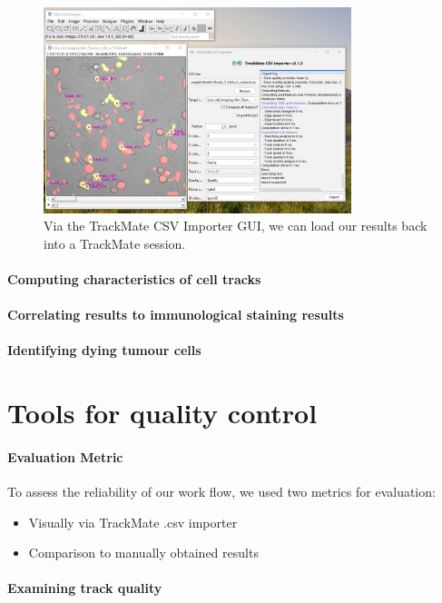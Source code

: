 \documentclass{report}
\begin{document}
\begin{figure}[h!]
\centering
\includegraphics[width=0.8\textwidth]{Screenshot_TrackMate_CSV_Importer.JPG}
\caption[TrackMate_CSV_Importer]{Via the TrackMate CSV Importer GUI, we can load our results back into a TrackMate session. \label{TrackMate_CSV_Importer}}
\end{figure}

\paragraph{Computing characteristics of cell tracks}

\paragraph{Correlating results to immunological staining results}

\paragraph{Identifying dying tumour cells}


\section{Tools for quality control}

\paragraph{Evaluation Metric}

To assess the reliability of our work flow, we used two metrics for evaluation:

\begin{itemize}
	\item Visually via TrackMate .csv importer
	\item Comparison to manually obtained results
\end{itemize}

\paragraph{ Examining track quality}



\renewcommand{\bibname}{References}

\end{document}
